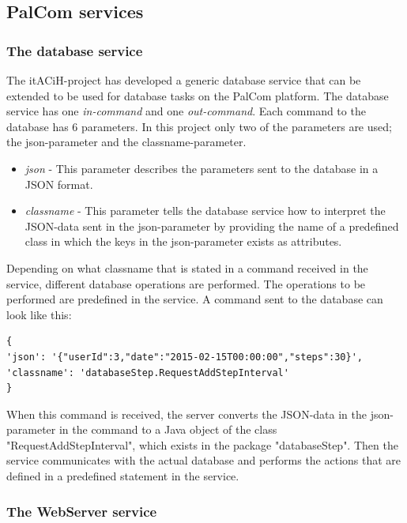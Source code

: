 \documentclass{cslthse-msc}
\begin{document}
\subsection{PalCom services}
\subsubsection{The database service}
\label{sec:dbservice}

The itACiH-project has developed a generic database service that can be extended to be used for database tasks on the PalCom platform. The database service has one \emph{in-command} and one \emph{out-command}. Each command to the database has 6 parameters. In this project only two of the parameters are used; the json-parameter and the classname-parameter. 

\begin{itemize}
    \item \emph{json} - This parameter describes the parameters sent to the database in a JSON format. 
    \item \emph{classname} - This parameter tells the database service how to interpret the JSON-data sent in the json-parameter by providing the name of a predefined class in which the keys in the json-parameter exists as attributes.
\end{itemize}

Depending on what classname that is stated in a command received in the service, different database operations are performed. The operations to be performed are predefined in the service. A command sent to the database can look like this: 

\begin{verbatim}
{
'json': '{"userId":3,"date":"2015-02-15T00:00:00","steps":30}',
'classname': 'databaseStep.RequestAddStepInterval'
}
\end{verbatim}  

When this command is received, the server converts the JSON-data in the json-parameter in the command to a Java object of the class "RequestAddStepInterval", which exists in the package "databaseStep". Then the service communicates with the actual database and performs the actions that are defined in a predefined statement in the service. 
	
\subsubsection{The WebServer service}
\label{sec:webserver}
\end{document}

